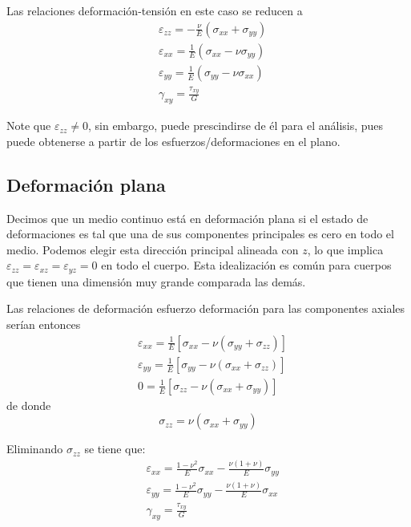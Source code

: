 \documentclass[../notas medios.tex]{subfiles}
\begin{document}
Las relaciones deformación-tensión en este caso se reducen a
\begin{equation} \label{platension}
\begin{split}
& \varepsilon_{zz} =  - \frac{\nu }{E}(\sigma_{xx} + \sigma_{yy}) \\
& \varepsilon_{xx} =    \frac{1}{E}(\sigma_{xx} - \nu \sigma_{yy})\\
& \varepsilon_{yy} = \frac{1}{E}(\sigma_{yy} - \nu \sigma_{xx})\\
& \gamma_{xy} = \frac{\tau_{xy}}{G}
\end{split}
\end{equation}

Note que \(\varepsilon_{zz} \neq 0\), sin embargo, puede prescindirse de él 
para el análisis, pues puede obtenerse a partir de los esfuerzos/deformaciones 
en el plano.


\subsection{Deformación plana}
Decimos que un medio continuo está en deformación plana si el estado de deformaciones es tal que una de sus componentes principales es cero en todo el medio. Podemos elegir esta dirección principal alineada con \(z\), lo que implica \(\varepsilon_{zz}=\varepsilon_{xz}=\varepsilon_{yz}=0\) en todo el cuerpo. Esta idealización es común para cuerpos que tienen una dimensión muy grande comparada las demás.

Las relaciones de deformación esfuerzo deformación para las componentes axiales serían entonces
\begin{align*}
&\varepsilon_{xx} = \frac{1}{E}\left[\sigma_{xx} - \nu (\sigma_{yy} + \sigma_{zz}) \right]\\
&\varepsilon_{yy} = \frac{1}{E}\left[\sigma_{yy} - \nu (\sigma_{xx} + \sigma_{zz}) \right]\\
&0 = \frac{1}{E}\left[\sigma_{zz} - \nu (\sigma_{xx} + \sigma_{yy}) \right]
\end{align*}
de donde
\[\sigma_{zz} = \nu (\sigma_{xx} + \sigma_{yy})\]

Eliminando $\sigma _{zz}$ se tiene que:
\begin{equation} \label{plastrain}
\begin{split}
& {\varepsilon _{xx}} = \frac{{1 - {\nu ^2}}}{E}{\sigma _{xx}} - \frac{{\nu (1 + \nu )}}{E}{\sigma _{yy}} \\
& {\varepsilon _{yy}} = \frac{{1 - {\nu ^2}}}{E}{\sigma _{yy}} - \frac{{\nu (1 + \nu )}}{E}{\sigma _{xx}} \\
& {\gamma _{xy}} = \frac{{{\tau _{xy}}}}{G}
\end{split}
\end{equation}
\end{document}
